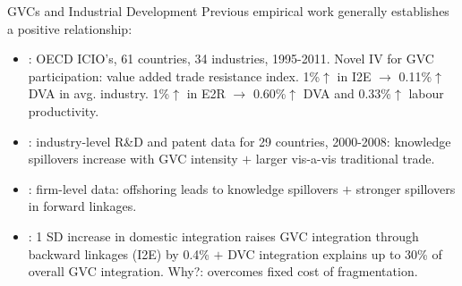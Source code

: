 \documentclass[compress]{beamer}
\newenvironment{noheadline}{
    \setbeamertemplate{headline}{}
    \addtobeamertemplate{frametitle}{\vspace*{-0.9\baselineskip}}{}
}{}
\begin{document}
\begin{noheadline}

\begin{frame}{GVCs and Industrial Development}
Previous empirical work generally establishes a positive relationship:
\begin{itemize}
\item \citet{Kummritz20161}: OECD ICIO's, 61 countries, 34 industries, 1995-2011. Novel IV for GVC participation: value added trade resistance index. 1\%$\uparrow$ in I2E $\to$ 0.11\%$\uparrow$ DVA in avg. industry. 1\%$\uparrow$ in E2R $\to$ 0.60\%$\uparrow$ DVA and 0.33\%$\uparrow$ labour productivity.
\item \citet{piermartini2014knowledge}: industry-level R\&D and patent data for 29 countries, 2000-2008: knowledge spillovers increase with GVC intensity $+$ larger vis-a-vis traditional trade. 
\item \citet{benz2015trade}: firm-level data: offshoring leads to knowledge spillovers $+$ stronger spillovers in forward linkages.
\item \citet{beverelli2019domestic}:  1 SD increase in domestic integration raises GVC integration through backward linkages (I2E) by 0.4\% $+$ DVC integration explains up to 30\% of overall GVC integration. Why?: overcomes fixed cost of fragmentation. %
\end{itemize}
\end{frame}
\end{noheadline}
\end{document}
